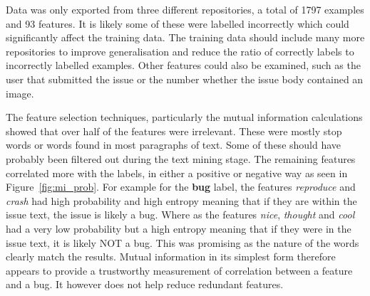 Data was only exported from three different repositories, a total of 1797 examples and 93 features. It is likely some of these
were labelled incorrectly which could significantly affect the training data. The training data should include many more
repositories to improve generalisation and reduce the ratio of correctly labels to incorrectly labelled examples. Other features
could also be examined, such as the user that submitted the issue or the number whether the issue body contained an image.

The feature selection techniques, particularly the mutual information calculations showed that over half of the features were
irrelevant. These were mostly stop words or words found in most paragraphs of text. Some of these should have probably been
filtered out during the text mining stage. The remaining features correlated more with the labels, in either a positive or
negative way as seen in Figure~\ref{fig:mi_prob}. For example for the \textbf{bug} label, the features \emph{reproduce} and
\emph{crash} had high probability and high entropy meaning that if they are within the issue text, the issue is likely a bug.
Where as the features \emph{nice}, \emph{thought} and \emph{cool} had a very low probability but a high entropy meaning that if
they were in the issue text, it is likely NOT a bug. This was promising as the nature of the words clearly match the results.
Mutual information in its simplest form therefore appears to provide a trustworthy measurement of correlation between a feature
and a bug. It however does not help reduce redundant features.

% 
% 
% 
% 
% 
